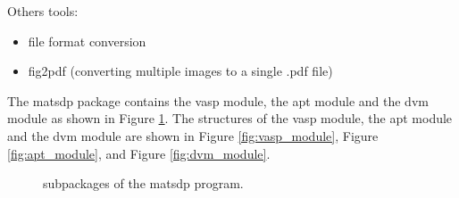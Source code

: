 \documentclass[12pt]{book}
\begin{document}
Others tools:
\begin{itemize}
\item file format conversion
\item fig2pdf (converting multiple images to a single .pdf file)
\end{itemize}

%
%
%

The matsdp package contains the vasp module, the apt module and the dvm module as shown in Figure \ref{fig:matsdp_main_structure}. The structures of the vasp module, the apt module and the dvm module are shown in Figure \ref{fig:vasp_module}, Figure \ref{fig:apt_module}, and Figure \ref{fig:dvm_module}.

\begin{figure}[htbp]
\centering
{}
\caption{\label{fig:matsdp_main_structure} subpackages of the matsdp program.}
\end{figure}
\end{document}
